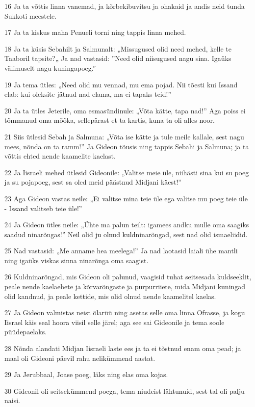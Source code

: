 \par 16 Ja ta võttis linna vanemad, ja kõrbekibuvitsu ja ohakaid ja andis neid tunda Sukkoti meestele.
\par 17 Ja ta kiskus maha Penueli torni ning tappis linna mehed.
\par 18 Ja ta küsis Sebahilt ja Salmunalt: „Missugused olid need mehed, kelle te Taaboril tapsite?„ Ja nad vastasid: ”Need olid niisugused nagu sina. Igaüks välimuselt nagu kuningapoeg.”
\par 19 Ja tema ütles: „Need olid mu vennad, mu ema pojad. Nii tõesti kui Issand elab: kui oleksite jätnud nad elama, ma ei tapaks teid!”
\par 20 Ja ta ütles Jeterile, oma esmasündinule: „Võta kätte, tapa nad!” Aga poiss ei tõmmanud oma mõõka, sellepärast et ta kartis, kuna ta oli alles noor.
\par 21 Siis ütlesid Sebah ja Salmuna: „Võta ise kätte ja tule meile kallale, sest nagu mees, nõnda on ta ramm!” Ja Gideon tõusis ning tappis Sebahi ja Salmuna; ja ta võttis ehted nende kaamelite kaelast.
\par 22 Ja Iisraeli mehed ütlesid Gideonile: „Valitse meie üle, niihästi sina kui su poeg ja su pojapoeg, sest sa oled meid päästnud Midjani käest!”
\par 23 Aga Gideon vastas neile: „Ei valitse mina teie üle ega valitse mu poeg teie üle - Issand valitseb teie üle!”
\par 24 Ja Gideon ütles neile: „Ühte ma palun teilt: igamees andku mulle oma saagiks saadud ninarõngas!” Neil olid ju olnud kuldninarõngad, sest nad olid ismaeliidid.
\par 25 Nad vastasid: „Me anname hea meelega!” Ja nad laotasid laiali ühe mantli ning igaüks viskas sinna ninarõnga oma saagist.
\par 26 Kuldninarõngad, mis Gideon oli palunud, vaagisid tuhat seitsesada kuldseeklit, peale nende kaelaehete ja kõrvarõngaste ja purpurriiete, mida Midjani kuningad olid kandnud, ja peale kettide, mis olid olnud nende kaamelitel kaelas.
\par 27 Ja Gideon valmistas neist õlarüü ning asetas selle oma linna Ofrasse, ja kogu Iisrael käis seal hoora viisil selle järel; aga see sai Gideonile ja tema soole püüdepaelaks.
\par 28 Nõnda alandati Midjan Iisraeli laste ees ja ta ei tõstnud enam oma pead; ja maal oli Gideoni päevil rahu nelikümmend aastat.
\par 29 Ja Jerubbaal, Joase poeg, läks ning elas oma kojas.
\par 30 Gideonil oli seitsekümmend poega, tema niudeist lähtunuid, sest tal oli palju naisi.

